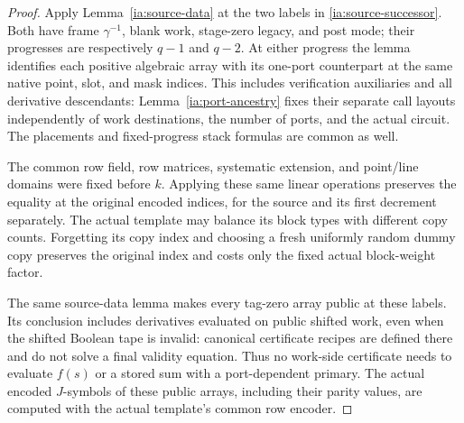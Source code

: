 \begin{proof}
Apply Lemma~\ref{ia:source-data} at the two labels in
\eqref{ia:source-successor}. Both have frame $\gamma^{-1}$, blank work,
stage-zero legacy, and post mode; their progresses are respectively
$q-1$ and $q-2$. At either progress the lemma identifies each positive
algebraic array with its one-port counterpart at the same native point,
slot, and mask indices. This includes verification auxiliaries and all
derivative descendants: Lemma~\ref{ia:port-ancestry} fixes their separate
call layouts independently of work destinations, the number of ports,
and the actual circuit. The placements and fixed-progress stack formulas
are common as well.

The common row field, row matrices, systematic extension, and point/line
domains were fixed before $k$. Applying these same linear operations
preserves the equality at the original encoded indices, for the source
and its first decrement separately. The actual template may balance its
block types with different copy counts. Forgetting its copy index and
choosing a fresh uniformly random dummy copy preserves the original index
and costs only the fixed actual block-weight factor.

The same source-data lemma makes every tag-zero array public at these
labels. Its conclusion includes derivatives evaluated on public shifted
work, even when the shifted Boolean tape is invalid: canonical certificate
recipes are defined there and do not solve a final validity equation.
Thus no work-side certificate needs to evaluate $f(s)$ or a stored sum
with a port-dependent primary. The actual encoded $J$-symbols of these
public arrays, including their parity values, are computed with the
actual template's common row encoder.


\end{proof}
